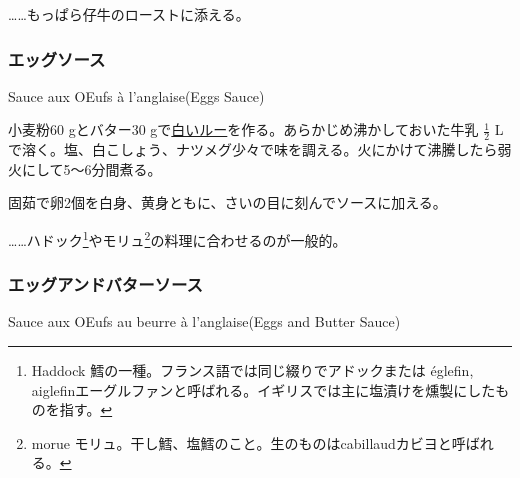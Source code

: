 \begin{recette}
\ldots{}\ldots{}もっぱら仔牛のローストに添える。

\atoaki{}

\hypertarget{eggs-sauce}{%
\subsubsection{エッグソース}\label{eggs-sauce}}

\begin{frsubenv}

Sauce aux OEufs à l'anglaise\hspace{1em}\normalfont(Eggs Sauce)

\end{frsubenv}


小麦粉60 gとバター30
gで\protect\hyperlink{roux-blanc}{白いルー}を作る。あらかじめ沸かしておいた牛乳
\(\frac{1}{2}\)
Lで溶く。塩、白こしょう、ナツメグ少々で味を調える。火にかけて沸騰したら弱火にして5〜6分間煮る。

固茹で卵2個を白身、黄身ともに、さいの目に刻んでソースに加える。

\ldots{}\ldots{}ハドック\footnote{Haddock
  鱈の一種。フランス語では同じ綴りでアドックまたは églefin,
  aiglefinエーグルファンと呼ばれる。イギリスでは主に塩漬けを燻製にしたものを指す。}やモリュ\footnote{morue
  モリュ。干し鱈、塩鱈のこと。生のものはcabillaudカビヨと呼ばれる。}の料理に合わせるのが一般的。

\atoaki{}

\hypertarget{eggs-and-butter-sauce}{%
\subsubsection{エッグアンドバターソース}\label{eggs-and-butter-sauce}}

\begin{frsubenv}

Sauce aux OEufs au beurre à l'anglaise\hspace{1em}\normalfont(Eggs and
Butter Sauce)


\end{frsubenv}
\end{recette}
